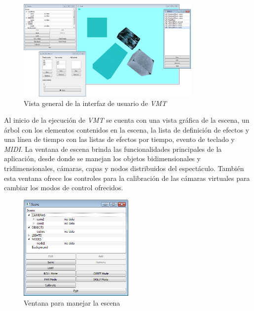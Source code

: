 \begin{figure}[H]
  \centering
    \includegraphics[width=0.8\textwidth]{./Cap5_vmt/vmt_todo.png}
  \caption[Imagen propia.]{Vista general de la interfaz de usuario de \emph{VMT}}
  \label{fig:VMT-MainWindow}
\end{figure}

Al inicio de la ejecución de \emph{VMT} se cuenta con una vista gráfica de la escena, un árbol con los elementos contenidos en la escena, la lista de definición de efectos y una línea de tiempo con las listas de efectos por tiempo, evento de teclado y \emph{MIDI}.
La ventana de escena brinda las funcionalidades principales de la aplicación, desde donde se manejan los objetos bidimensionales y tridimensionales, cámaras, capas y nodos distribuidos del espectáculo. También esta ventana ofrece los controles para la calibración de las cámaras virtuales para cambiar los modos de control ofrecidos.

\begin{figure}[H]
  \centering
    \includegraphics[width=0.5\textwidth]{./Cap5_vmt/vmt_scene.png}
  \caption[Imagen propia.]{Ventana para manejar la escena}
  \label{fig:VMT-SceneWindow}
\end{figure}

